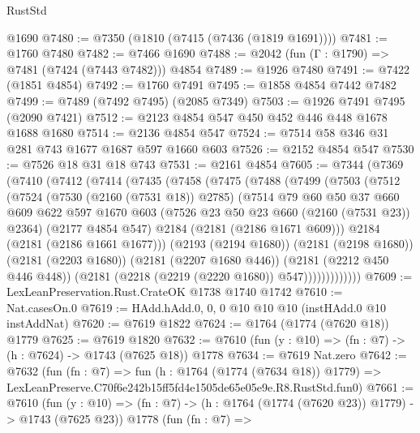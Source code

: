 \begin{lexlean}{RustStd}
\begin{coremodule}
    @1690
@7480 := @7350 (@1810 (@7415 (@7436 (@1819 @1691))))
@7481 := @1760 @7480
@7482 := @7466 @1690
@7488 := @2042 (fun (Γ : @1790) => @7481 (@7424 (@7443 @7482))) @4854
@7489 := @1926 @7480
@7491 := @7422 (@1851 @4854)
@7492 := @1760 @7491
@7495 := @1858 @4854 @7442 @7482
@7499 := @7489 (@7492 @7495) (@2085 @7349)
@7503 := @1926 @7491 @7495 (@2090 @7421)
@7512 := @2123 @4854 @547 @450 @452 @446 @448 @1678 @1688 @1680
@7514 := @2136 @4854 @547
@7524 := @7514 @58 @346 @31 @281 @743 @1677 @1687 @597 @1660 @603
@7526 := @2152 @4854 @547
@7530 := @7526 @18 @31 @18 @743
@7531 := @2161 @4854
@7605 := @7344
    (@7369
      (@7410
        (@7412
          (@7414
            (@7435
              (@7458
                (@7475
                  (@7488
                    (@7499
                      (@7503
                        (@7512
                          (@7524
                            (@7530 (@2160 (@7531 @18)) @2785)
                            (@7514
                              @79
                              @60
                              @50
                              @37
                              @660
                              @609
                              @622
                              @597
                              @1670
                              @603
                              (@7526 @23 @50 @23 @660 (@2160 (@7531 @23)) @2364)
                              (@2177 @4854 @547)
                              @2184
                              (@2181 (@2186 @1671 @609)))
                            @2184
                            (@2181 (@2186 @1661 @1677)))
                          (@2193 (@2194 @1680))
                          (@2181 (@2198 @1680))
                          (@2181 (@2203 @1680))
                          (@2181 (@2207 @1680 @446))
                          (@2181 (@2212 @450 @446 @448))
                          (@2181 (@2218 (@2219 (@2220 @1680)) @547)))))))))))))
@7609 := LexLeanPreservation.Rust.CrateOK @1738 @1740 @1742
@7610 := Nat.casesOn.{0}
@7619 := HAdd.hAdd.{0, 0, 0} @10 @10 @10 (instHAdd.{0} @10 instAddNat)
@7620 := @7619 @1822
@7624 := @1764 (@1774 (@7620 @18)) @1779
@7625 := @7619 @1820
@7632 := @7610 (fun (y : @10) => (fn : @7) -> (h : @7624) -> @1743 (@7625 @18)) @1778
@7634 := @7619 Nat.zero
@7642 := @7632
    (fun (fn : @7) =>
    fun (h : @1764 (@1774 (@7634 @18)) @1779) =>
    LexLeanPreserve.C70f6e242b15ff5fd4e1505de65e05e9e.R8.RustStd.fun0)
@7661 := @7610
    (fun (y : @10) => (fn : @7) -> (h : @1764 (@1774 (@7620 @23)) @1779) -> @1743 (@7625 @23))
    @1778
    (fun (fn : @7) =>

\end{coremodule}
\end{lexlean}
